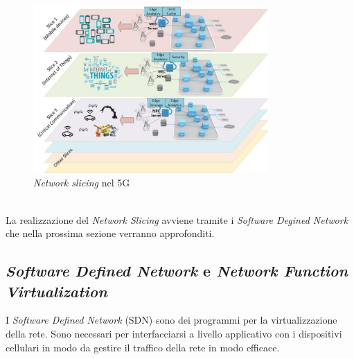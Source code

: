 \begin{figure}[ht]
    \centering
    \includegraphics[width=0.8\textwidth]{images/5g-slicing.jpg}
    \caption{\textit{Network slicing} nel 5G}
\end{figure}\\
La realizzazione del \textit{Network Slicing} avviene tramite i \textit{Software Degined Network} che nella prossima sezione verranno approfonditi.

\subsection{\textit{Software Defined Network} e  \textit{Network Function Virtualization}}
I \textit{Software Defined Network} (SDN) sono dei programmi per la virtualizzazione della rete. Sono necessari per interfacciarsi a livello applicativo con i dispositivi cellulari 
in modo da gestire il traffico della rete in modo efficace\cite{5g-sdn}.